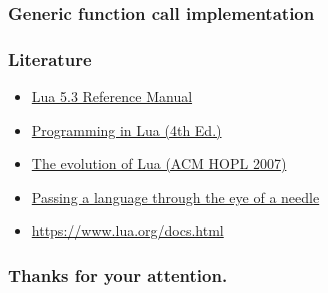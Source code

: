 \documentclass{beamer}
\newif\iftransitions
\begin{document}
\begin{frame}

  \frametitle{Generic function call implementation}

\end{frame}

\iftransitions

\frame{%
\setbeamercolor{normal text}{fg=gray,bg=}
\setbeamercolor{alerted text}{fg=black,bg=}
\usebeamercolor{normal text}
\begin{itemize}
\item \alert<+>{Hallo}
\item \alert<+>{Welt}
\item \alert<+>{Foobar}
\end{itemize}
}

\fi

\begin{frame}
  \frametitle{Literature}

  \begin{itemize}
  \item \href{https://www.lua.org/manual/5.3/}{Lua 5.3 Reference Manual}
  \item \href{https://www.lua.org/pil/}{Programming in Lua (4th Ed.)}
  \item \href{https://www.lua.org/doc/hopl.pdf}{The evolution of Lua (ACM HOPL 2007)}
  \item \href{https://dl.acm.org/citation.cfm?id=1983083}{Passing a language through the eye of a needle}
  \item \href{https://www.lua.org/docs.html}{https://www.lua.org/docs.html}
  \end{itemize}
\end{frame}

\begin{frame}
  \frametitle{Thanks for your attention.}
\end{frame}
\end{document}
